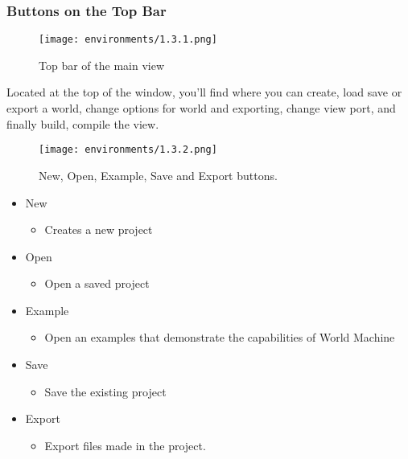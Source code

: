 \documentclass[../main.tex]{subfiles}
\begin{document}
\subsubsection{Buttons on the Top Bar}
\begin{figure}[H]
\texttt{[image: environments/1.3.1.png]}
\caption{Top bar of the main view}
\end{figure}
Located at the top of the window, you’ll find where you can create, load save or export a world, change options for world and exporting, change view port, and finally build, compile the view.
\begin{figure}[H]
\texttt{[image: environments/1.3.2.png]}
\caption{New, Open, Example, Save and Export buttons.}
\end{figure}
\begin{itemize}
    \item New
        \begin{itemize}
            \item Creates a new project
        \end{itemize}
    \item Open
        \begin{itemize}
            \item Open a saved project
        \end{itemize}
    \item Example
        \begin{itemize}
            \item Open an examples that demonstrate the capabilities of World Machine
        \end{itemize}
    \item Save
        \begin{itemize}
            \item Save the existing project
        \end{itemize}
    \item Export
        \begin{itemize}
            \item Export files made in the project.
        \end{itemize}
\end{itemize}
\end{document}
